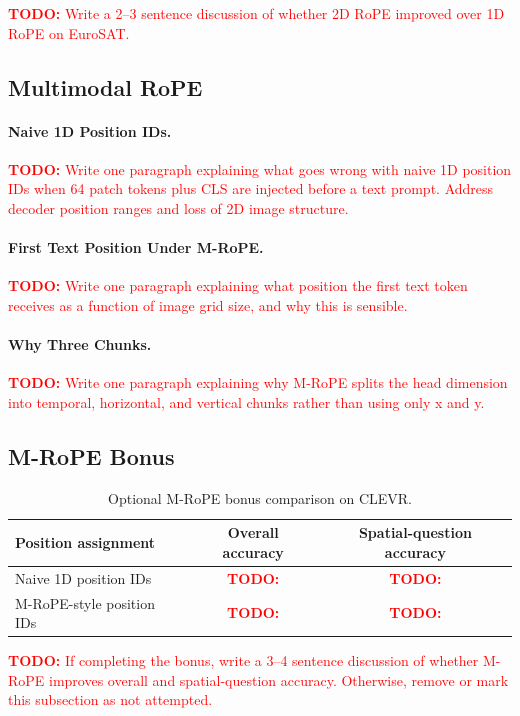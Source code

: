 \documentclass[11pt]{article}
\newcommand{\TODO}[1]{\textcolor{red}{\textbf{TODO:} #1}}
\begin{document}
\TODO{Write a 2--3 sentence discussion of whether 2D RoPE improved over 1D RoPE on EuroSAT.}

\subsection{Multimodal RoPE}

\paragraph{Naive 1D Position IDs.}
\TODO{Write one paragraph explaining what goes wrong with naive 1D position IDs when 64 patch tokens plus CLS are injected before a text prompt. Address decoder position ranges and loss of 2D image structure.}

\paragraph{First Text Position Under M-RoPE.}
\TODO{Write one paragraph explaining what position the first text token receives as a function of image grid size, and why this is sensible.}

\paragraph{Why Three Chunks.}
\TODO{Write one paragraph explaining why M-RoPE splits the head dimension into temporal, horizontal, and vertical chunks rather than using only x and y.}

\subsection{M-RoPE Bonus}

\begin{table}[H]
    \centering
    \begin{tabular}{lcc}
        \toprule
        Position assignment & Overall accuracy & Spatial-question accuracy \\
        \midrule
        Naive 1D position IDs & \TODO{} & \TODO{} \\
        M-RoPE-style position IDs & \TODO{} & \TODO{} \\
        \bottomrule
    \end{tabular}
    \caption{Optional M-RoPE bonus comparison on CLEVR.}
    \label{tab:mrope-bonus}
\end{table}

\TODO{If completing the bonus, write a 3--4 sentence discussion of whether M-RoPE improves overall and spatial-question accuracy. Otherwise, remove or mark this subsection as not attempted.}
\end{document}
